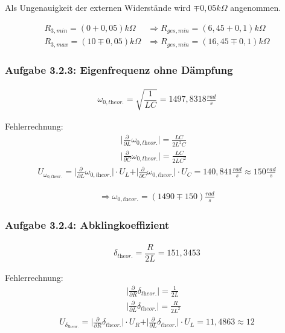 \documentclass[a4paper]{scrartcl}
\numberwithin{equation}{subsection}
\begin{document}
Als Ungenauigkeit der externen Widerstände wird $\mp 0,05 k \Omega$ angenommen.

\begin{align*}
R_{3,min} = (0+0,05)k\Omega &\Rightarrow R_{ges,min} = (6,45+0,1)k\Omega \\
R_{3,max} = (10\mp0,05)k\Omega &\Rightarrow R_{ges,min} = (16,45\mp0,1)k\Omega
\end{align*}

\subsubsection{Aufgabe 3.2.3: Eigenfrequenz ohne Dämpfung}

\begin{align}
\omega_{0,\textit{theor.}} = \sqrt{\dfrac{1}{LC}}= 1497,8318 \frac{rad}{s}
\end{align}

Fehlerrechnung:
\begin{align*}
\vert \frac{\partial}{\partial L}\omega_{0,\textit{theor.}}\vert = \frac{LC}{2L^2C} &\\
\vert \frac{\partial}{\partial C}\omega_{0,\textit{theor.}}\vert = \frac{LC}{2LC^2} &
\end{align*}
\begin{align*}
U_{\omega_{0,\textit{theor.}}} = \vert \frac{\partial}{\partial L}\omega_{0,\textit{theor.}}\vert \cdot U_L + \vert \frac{\partial}{\partial C}\omega_{0,\textit{theor.}}\vert \cdot U_C = 140,841 \frac{rad}{s} \approx 150 \frac{rad}{s}
\end{align*}

\begin{align*}
\Rightarrow \omega_{0,\textit{theor.}} = (1490 \mp 150) \frac{rad}{s}
\end{align*}

\subsubsection{Aufgabe 3.2.4: Abklingkoeffizient}

\begin{align}
\delta_{\textit{theor.}} = \dfrac{R}{2L}= 151,3453
\end{align}

Fehlerrechnung:
\begin{align*}
\vert \frac{\partial}{\partial R}\delta_{\textit{theor.}}\vert = \frac{1}{2L} &\\
\vert \frac{\partial}{\partial L}\delta_{\textit{theor.}}\vert = \frac{R}{2L^2} &
\end{align*}
\begin{align*}
U_{\delta_{\textit{theor.}}} = \vert \frac{\partial}{\partial R}\delta_{\textit{theor.}}\vert \cdot U_R + \vert \frac{\partial}{\partial L}\delta_{\textit{theor.}}\vert \cdot U_L = 11,4863 \approx 12 
\end{align*}
\end{document}
